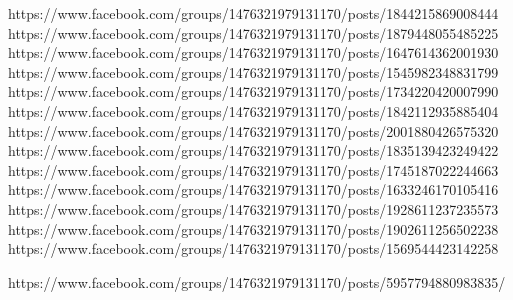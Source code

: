  
 
 
 
 



https://www.facebook.com/groups/1476321979131170/posts/1844215869008444
https://www.facebook.com/groups/1476321979131170/posts/1879448055485225
https://www.facebook.com/groups/1476321979131170/posts/1647614362001930
https://www.facebook.com/groups/1476321979131170/posts/1545982348831799
https://www.facebook.com/groups/1476321979131170/posts/1734220420007990
https://www.facebook.com/groups/1476321979131170/posts/1842112935885404
https://www.facebook.com/groups/1476321979131170/posts/2001880426575320
https://www.facebook.com/groups/1476321979131170/posts/1835139423249422
https://www.facebook.com/groups/1476321979131170/posts/1745187022244663
https://www.facebook.com/groups/1476321979131170/posts/1633246170105416
https://www.facebook.com/groups/1476321979131170/posts/1928611237235573
https://www.facebook.com/groups/1476321979131170/posts/1902611256502238
https://www.facebook.com/groups/1476321979131170/posts/1569544423142258

https://www.facebook.com/groups/1476321979131170/posts/5957794880983835/
